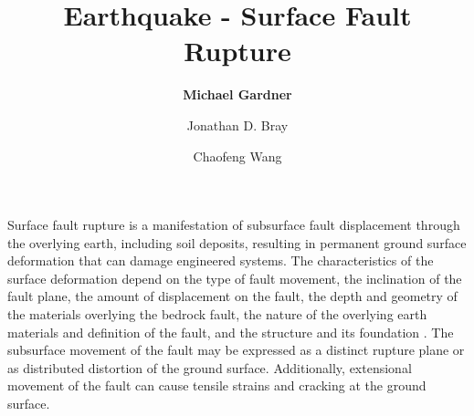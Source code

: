 %
%
%


%
%
%
%
%
%
%
%

\title{Earthquake - Surface Fault Rupture}
\author{
    \textbf{Michael Gardner } 
    \and Jonathan D. Bray
    \and Chaofeng Wang}
\tocauthor{}
%
%
\maketitle

Surface fault rupture is a manifestation of subsurface fault displacement through the overlying earth, including soil deposits, resulting in permanent ground surface deformation that can damage engineered systems. The characteristics of the surface deformation depend on the type of fault movement, the inclination of the fault plane, the amount of displacement on the fault, the depth and geometry of the materials overlying the bedrock fault, the nature of the overlying earth materials and definition of the fault, and the structure and its foundation \citep{bray2001developing}. The subsurface movement of the fault may be expressed as a distinct rupture plane or as distributed distortion of the ground surface. Additionally, extensional movement of the fault can cause tensile strains and cracking at the ground surface.

